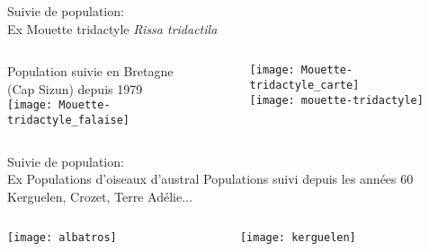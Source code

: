 \documentclass[10pt]{beamer}
\begin{document}
\begin{frame}{Suivie de population:\\ Ex Mouette tridactyle \textit{Rissa tridactila}}
 \begin{columns}
    \begin{column}[c]{0.5\textwidth}
     \begin{center}
       Population suivie en Bretagne \\(Cap Sizun) depuis 1979\\ 
       \texttt{[image: Mouette-tridactyle\_falaise]}
  \end{center}
    \end{column}
    \begin{column}[c]{0.5\textwidth}
     \begin{center}
       \texttt{[image: Mouette-tridactyle\_carte]}\\
        \texttt{[image: mouette-tridactyle]}
  \end{center}
    \end{column}
  \end{columns}
\end{frame}
\begin{frame}{Suivie de population:\\ Ex Populations d'oiseaux d'austral}
 Populations suivi depuis les années 60 \\
       Kerguelen, Crozet, Terre Adélie...
 \begin{columns}
    \begin{column}[c]{0.5\textwidth}
     \begin{center}
      
       \texttt{[image: albatros]}
  \end{center}
    \end{column}
    \begin{column}[c]{0.5\textwidth}
     \begin{center}
       \texttt{[image: kerguelen]}
  \end{center}
    \end{column}
  \end{columns}
\end{frame}
\end{document}
